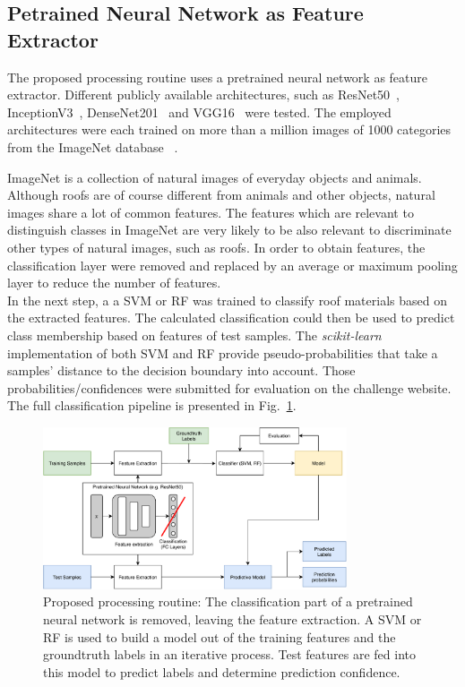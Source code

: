\documentclass[11pt]{article}
\begin{document}
	
	\subsection{Petrained Neural Network as Feature Extractor}
	The proposed processing routine uses a pretrained neural network as feature extractor. Different publicly available architectures, such as ResNet50~\cite{resnet}, InceptionV3~\cite{inceptionv3}, DenseNet201~\cite{densenet} and VGG16~\cite{vgg} were tested. The employed architectures were each trained on more than a million images of 1000 categories from the ImageNet database ~\cite{imagenet}. 
	
	ImageNet is a collection of natural images of everyday objects and animals. Although roofs are of course different from animals and other objects, natural images share a lot of common features. The features which are relevant to distinguish classes in ImageNet are very likely to be also relevant to discriminate other types of natural images, such as roofs.
	In order to obtain features, the classification layer were removed and replaced by an average or maximum pooling layer to reduce the number of features.\\	
	
	In the next step, a a SVM or RF was trained to classify roof materials based on the extracted features. The calculated classification could then be used to predict class membership based on features of test samples. The \textit{scikit-learn} implementation of both SVM and RF provide pseudo-probabilities that take a samples' distance to the decision boundary into account. Those probabilities/confidences were submitted for evaluation on the challenge website.
	The full classification pipeline is presented in Fig.~\ref{fig:flowchart}.	
	
	\begin{figure}
		\centering		
		\includegraphics[width=0.8\textwidth]{figures/flowchart.pdf}
		\caption{Proposed processing routine: The classification part of a pretrained neural network is removed, leaving the feature extraction. A SVM or RF is used to build a model out of the training features and the groundtruth labels in an iterative process. Test features are fed into this model to predict labels and determine prediction confidence.}
		\label{fig:flowchart}
	\end{figure}
\end{document}
